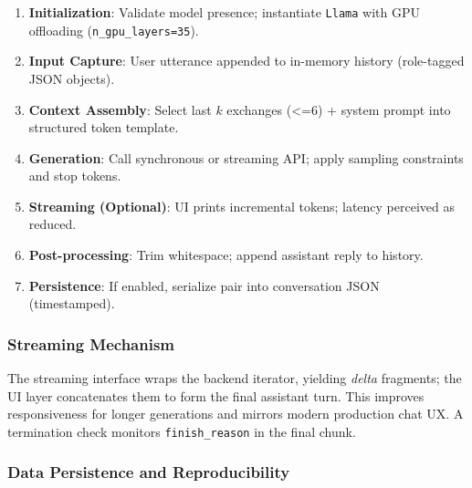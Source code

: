 \documentclass[12pt,a4paper]{article}
\begin{document}
\begin{enumerate}[leftmargin=1.2em]
    \item \textbf{Initialization}: Validate model presence; instantiate \texttt{Llama} with GPU offloading (\texttt{n\_gpu\_layers=35}).
    \item \textbf{Input Capture}: User utterance appended to in-memory history (role-tagged JSON objects).
    \item \textbf{Context Assembly}: Select last $k$ exchanges (<=6) + system prompt into structured token template.
    \item \textbf{Generation}: Call synchronous or streaming API; apply sampling constraints and stop tokens.
    \item \textbf{Streaming (Optional)}: UI prints incremental tokens; latency perceived as reduced.
    \item \textbf{Post-processing}: Trim whitespace; append assistant reply to history.
    \item \textbf{Persistence}: If enabled, serialize pair into conversation JSON (timestamped). 
\end{enumerate}

\subsubsection*{Streaming Mechanism}

The streaming interface wraps the backend iterator, yielding \emph{delta} fragments; the UI layer concatenates them to form the final assistant turn. This improves responsiveness for longer generations and mirrors modern production chat UX. A termination check monitors \texttt{finish\_reason} in the final chunk.

\subsubsection*{Data Persistence and Reproducibility}
\end{document}
